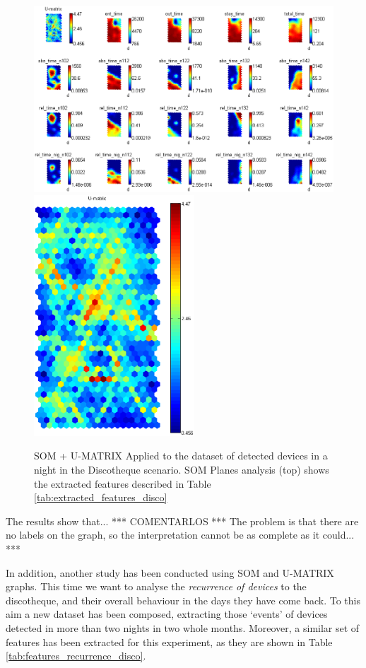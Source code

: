 \documentclass[preprint]{elsarticle}
\begin{document}
\begin{figure}[!ht]
	\begin{center}
		\includegraphics[width=12cm]{imgs/DISCO/som_disco_sin_no_detec.eps}
		\includegraphics[width=6cm]{imgs/DISCO/umatrix_disco_sin_no_detec.eps}
		\caption{SOM + U-MATRIX Applied to the dataset of detected devices in a night in the Discotheque scenario. SOM Planes analysis (top) shows the extracted features described in Table \ref{tab:extracted_features_disco}}
		\label{fig:som_disco_sin_no_detec}
	\end{center}
\end{figure}

The results show that... *** COMENTARLOS ***
The problem is that there are no labels on the graph, so the interpretation cannot be as complete as it could... ***


In addition, another study has been conducted using SOM and U-MATRIX graphs. This time we want to analyse the \textit{recurrence of devices} to the discotheque, and their overall behaviour in the days they have come back. To this aim a new dataset has been composed, extracting those `events' of devices detected in more than two nights in two whole months.
Moreover, a similar set of features has been extracted for this experiment, as they are shown in Table \ref{tab:features_recurrence_disco}.
\end{document}
